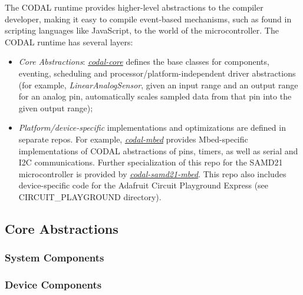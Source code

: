 The CODAL runtime provides higher-level abstractions to the compiler developer, making it
easy to compile event-based mechanisms, such as found in scripting languages like JavaScript, to the world of the
microcontroller.   The CODAL runtime has several layers:
\begin{itemize}

\item \emph{Core Abstractions}:
\emph{\href{https://www.github.com/lancaster-university/codal-core}{codal-core}} defines the base classes for
components, eventing, scheduling and processor/platform-independent driver abstractions (for example,
\emph{LinearAnalogSensor}, given an input range and an output range for an analog pin, automatically scales sampled data 
from that pin into the given output range);

\item \emph{Platform/device-specific} implementations and optimizations are defined in separate repos. For example, 
\emph{\href{https://www.github.com/lancaster-university/codal-mbed}{codal-mbed}}
provides Mbed-specific implementations of CODAL abstractions of pins, timers, as well as serial and I2C
communications. Further specialization of this repo for the SAMD21 microcontroller is provided by 
\emph{\href{https://www.github.com/lancaster-university/codal-samd21-mbed}{codal-samd21-mbed}}. 
This repo also includes device-specific code for the Adafruit Circuit Playground Express (see CIRCUIT\_PLAYGROUND
directory).

\end{itemize}


\subsection{Core Abstractions}

\subsubsection{System Components}



\subsubsection{Device Components}

